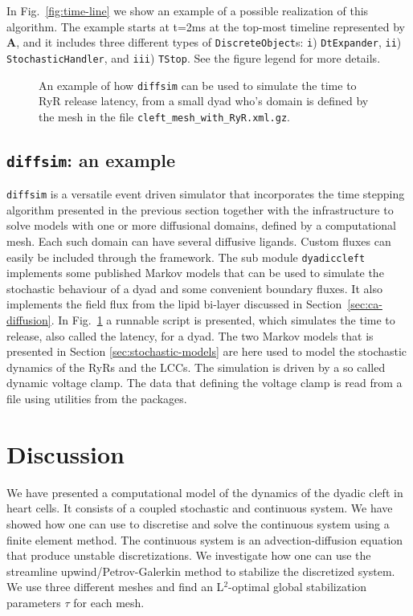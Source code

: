 In Fig.~\ref{fig:time-line} we show an example of a possible realization of this algorithm. The example starts at t=2ms at the top-most timeline represented by \textbf{A}, and it includes three different types of \texttt{DiscreteObject}s: \texttt{i}) \texttt{DtExpander}, \texttt{ii}) \texttt{StochasticHandler}, and \texttt{iii}) \texttt{TStop}. See the figure legend for more details.\par
\begin{figure}
  \centering
  \vspace{-1.5em}
  \caption{An example of how \texttt{diffsim} can be used to simulate the time to RyR release latency, from a small dyad who's domain is defined by the mesh in the file \texttt{cleft\_mesh\_with\_RyR.xml.gz}.}
  \label{fig:diffsim_test}
\end{figure}

\subsection*{\texttt{diffsim}: an example}
\texttt{diffsim} is a versatile event driven simulator that incorporates the time stepping algorithm presented in the previous section together with the infrastructure to solve models with one or more diffusional domains, defined by a computational mesh. Each such domain can have several diffusive ligands. Custom fluxes can easily be included through the framework. The sub module \texttt{dyadiccleft} implements some published Markov models that can be used to simulate the stochastic behaviour of a dyad and some convenient boundary fluxes. It also implements the field flux from the lipid bi-layer discussed in Section~\ref{sec:ca-diffusion}. In Fig.~\ref{fig:diffsim_test} a runnable script is presented, which simulates the time to release, also called the latency, for a dyad. The two Markov models that is presented in Section \ref{sec:stochastic-models} are here used to model the stochastic dynamics of the RyRs and the LCCs. The simulation is driven by a so called dynamic voltage clamp. The data that defining the voltage clamp is read from a file using utilities from the \numpy {} packages.\par

\section{Discussion}
We have presented a computational model of the \Ca dynamics of the dyadic cleft in heart cells. It consists of a coupled stochastic and continuous system. We have showed how one can use \pydolfin to discretise and solve the continuous system using a finite element method. The continuous system is an advection-diffusion equation that produce unstable discretizations. We investigate how one can use the streamline upwind/Petrov-Galerkin method to stabilize the discretized system. We use three different meshes and find an L$^2$-optimal global stabilization parameters $\tau$ for each mesh.\par

